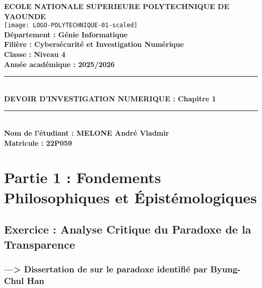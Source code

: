 \documentclass[11pt,a4paper]{article}
\begin{document}
\begin{titlepage}
    \centering
    {\Large \textbf{ECOLE NATIONALE SUPERIEURE POLYTECHNIQUE DE YAOUNDE}}\\[1.5cm]

    \texttt{[image: LOGO-POLYTECHNIQUE-01-scaled]} \\[1.5cm] 

    {\Large \textbf{Département : Génie Informatique}}\\[0.3cm]
    {\Large \textbf{Filière : Cybersécurité et Investigation Numérique}}\\[0.3cm]
    {\Large \textbf{Classe : Niveau 4}}\\[0.3cm]
    {\Large \textbf{Année académique : 2025/2026}}\\[2cm]

    \rule{\linewidth}{0.5mm} \\[0.4cm]
    {\huge \textbf{DEVOIR D'INVESTIGATION NUMERIQUE : Chapitre 1}}\\[0.4cm]
    \rule{\linewidth}{0.5mm} \\[3cm]

    \hfill \textbf{Nom de l'étudiant : MELONE André Vladmir } \\[1.5cm]
	\hfill \textbf{Matricule : 22P059 } \\[1.5cm]

    \vfill
\end{titlepage}

\tableofcontents
\newpage

\section{Partie 1 : Fondements Philosophiques et Épistémologiques}

\subsection{Exercice : Analyse Critique du Paradoxe de la Transparence}

\subsubsection{---> Dissertation de sur le paradoxe identifié par Byung-Chul Han}
\end{document}
